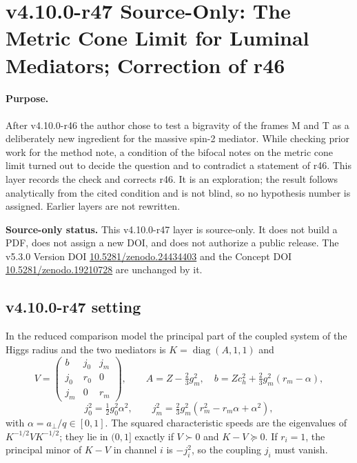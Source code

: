 \clearpage
\section*{v4.10.0-r47 Source-Only: The Metric Cone Limit for Luminal Mediators; Correction of r46}
\label{sec:v4100-r47-cone-limit}

\paragraph{Purpose.}
After v4.10.0-r46 the author chose to test a bigravity of the frames M and T as a deliberately new ingredient for the massive spin-2 mediator.
While checking prior work for the method note, a condition of the bifocal notes on the metric cone limit turned out to decide the question and
to contradict a statement of r46.  This layer records the check and corrects r46.  It is an exploration; the result follows analytically from the
cited condition and is not blind, so no hypothesis number is assigned.  Earlier layers are not rewritten.

\noindent\textbf{Source-only status.}
This v4.10.0-r47 layer is source-only.  It does not build a PDF, does not assign a new DOI,
and does not authorize a public release.  The v5.3.0 Version DOI
\href{https://doi.org/10.5281/zenodo.24434403}{10.5281/zenodo.24434403} and the Concept DOI
\href{https://doi.org/10.5281/zenodo.19210728}{10.5281/zenodo.19210728} are unchanged by it.

\subsection*{v4.10.0-r47 setting}
\label{subsec:v4100-r47-setting}

In the reduced comparison model the principal part of the coupled system of the Higgs radius and the two mediators is \(K=\operatorname{diag}(A,1,1)\) and
\[
 V=\begin{pmatrix} b & j_0 & j_m\\ j_0 & r_0 & 0\\ j_m & 0 & r_m\end{pmatrix},\qquad
 A=Z-\tfrac23g_m^2,\quad b=Zc_h^2+\tfrac23g_m^2(r_m-\alpha),
\]
\[
 j_0^2=\tfrac12g_0^2\alpha^2,\qquad j_m^2=\tfrac23g_m^2(r_m^2-r_m\alpha+\alpha^2),
\]
with \(\alpha=a_\perp/q\in[0,1]\).  The squared characteristic speeds are the eigenvalues of \(K^{-1/2}VK^{-1/2}\); they lie in \((0,1]\) exactly if \(V\succ0\) and \(K-V\succeq0\).  If
\(r_i=1\), the principal minor of \(K-V\) in channel \(i\) is \(-j_i^2\), so the coupling \(j_i\) must vanish.

